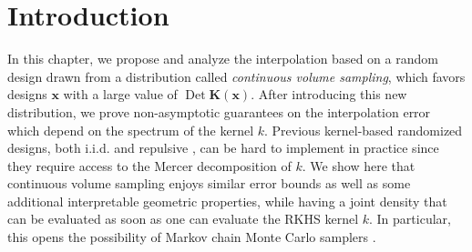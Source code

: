 \documentclass[twoside,11pt]{book}
\numberwithin{theorem}{chapter}
\numberwithin{definition}{chapter}
\numberwithin{proposition}{chapter}
\numberwithin{corollary}{chapter}
\numberwithin{example}{chapter}
\numberwithin{lemma}{chapter}
\numberwithin{assumption}{chapter}
\numberwithin{equation}{chapter}
\numberwithin{figure}{chapter}
\DeclareMathOperator{\Det}{Det}
\DeclareMathOperator{\X}{\mathcal{X}}
\newcommand{\pc}[1]{\textcolor{blue}{#1}}
\begin{document}
\section{Introduction}
\label{CVS_sec:introduction}


In this chapter, we propose and analyze the interpolation based on a random design drawn from a distribution called \emph{continuous volume sampling}, which favors designs $\bm{x}$ with a large value of $\Det \bm{K}(\bm{x})$. After introducing this new distribution, we prove non-asymptotic guarantees on the interpolation error which depend on the spectrum of the kernel $k$. Previous kernel-based randomized designs, both i.i.d. \citep{Bac17} and repulsive \citep{BeBaCh19}, can be hard to implement in practice since they require access to the Mercer decomposition of $k$. We show here that continuous volume sampling enjoys similar error bounds as well as some additional interpretable geometric properties, while having a joint density that can be evaluated as soon as one can evaluate the RKHS kernel $k$. In particular, this opens the possibility of Markov chain Monte Carlo samplers \citep{ReGh19}.
\end{document}
